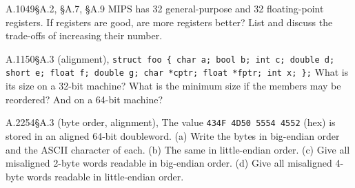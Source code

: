 \begin{tbexercise}[A]{A.10}{49}{\S A.2, \S A.7, \S A.9}
MIPS has 32 general-purpose and 32 floating-point registers. If registers are good,
are more registers better? List and discuss the trade-offs of increasing their number.
\end{tbexercise}

\begin{tbexercise}[A]{A.11}{50}{\S A.3 (alignment), }
\texttt{struct foo \{ char a; bool b; int c; double d; short e; float f; double g;
char *cptr; float *fptr; int x; \};} What is its size on a 32-bit machine? What is
the minimum size if the members may be reordered? And on a 64-bit machine?
\end{tbexercise}

\begin{tbexercise}[A]{A.22}{54}{\S A.3 (byte order, alignment), }
The value \texttt{434F 4D50 5554 4552} (hex) is stored in an aligned 64-bit
doubleword. (a) Write the bytes in big-endian order and the ASCII character of each.
(b) The same in little-endian order. (c) Give all misaligned 2-byte words readable in
big-endian order. (d) Give all misaligned 4-byte words readable in little-endian order.
\end{tbexercise}


